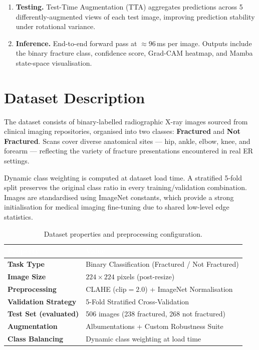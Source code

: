\documentclass[12pt, a4paper]{article}
\begin{document}
\begin{enumerate}[label=\textbf{Stage \arabic*.}, leftmargin=*, itemsep=6pt]
  \item \textbf{Testing.}
  Test-Time Augmentation (TTA) aggregates predictions across 5 differently-augmented views of
  each test image, improving prediction stability under rotational variance.

  \item \textbf{Inference.}
  End-to-end forward pass at $\approx 96$\,ms per image. Outputs include the binary fracture class,
  confidence score, Grad-CAM heatmap, and Mamba state-space visualisation.

\end{enumerate}

\section{Dataset Description}

The dataset consists of binary-labelled radiographic X-ray images sourced from clinical imaging
repositories, organised into two classes: \textbf{Fractured} and \textbf{Not Fractured}. Scans
cover diverse anatomical sites — hip, ankle, elbow, knee, and forearm — reflecting the variety
of fracture presentations encountered in real ER settings.

Dynamic class weighting is computed at dataset load time. A stratified 5-fold split preserves the
original class ratio in every training/validation combination. Images are standardised using
ImageNet constants, which provide a strong initialisation for medical imaging fine-tuning due to
shared low-level edge statistics.

\begin{table}[H]
\centering
\caption{Dataset properties and preprocessing configuration.}
\label{tab:dataset}
\begin{tabularx}{\textwidth}{>{\bfseries}lX}
\toprule
\rowcolor{NavyBlue}
\textcolor{white}{Property} & \textcolor{white}{Value} \\
\midrule
Task Type             & Binary Classification (Fractured / Not Fractured) \\
Image Size            & $224 \times 224$ pixels (post-resize) \\
Preprocessing         & CLAHE (clip$=2.0$) + ImageNet Normalisation \\
Validation Strategy   & 5-Fold Stratified Cross-Validation \\
Test Set (evaluated)  & 506 images (238 fractured, 268 not fractured) \\
Augmentation          & Albumentations + Custom Robustness Suite \\
Class Balancing       & Dynamic class weighting at load time \\
\bottomrule
\end{tabularx}
\end{table}
\end{document}
